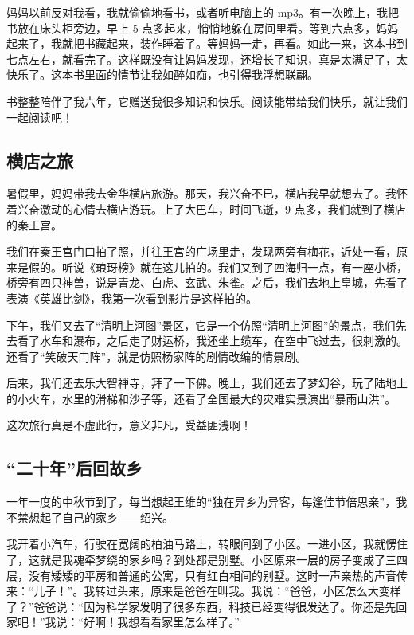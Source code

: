 \documentclass[UTF8,a4paper,titlepage,twoside,10.5pt]{article}
\begin{document}
妈妈以前反对我看，我就偷偷地看书，或者听电脑上的 mp3。有一次晚上，我把书放在床头柜旁边，早上 5 点多起来，悄悄地躲在房间里看。等到六点多，妈妈起来了，我就把书藏起来，装作睡着了。等妈妈一走，再看。如此一来，这本书到七点左右，就看完了。这样既没有让妈妈发现，还增长了知识，真是太满足了，太快乐了。这本书里面的情节让我如醉如痴，也引得我浮想联翩。

书整整陪伴了我六年，它赠送我很多知识和快乐。阅读能带给我们快乐，就让我们一起阅读吧！

\subsection{横店之旅}
\label{sec:orgd0e0a89}

暑假里，妈妈带我去金华横店旅游。那天，我兴奋不已，横店我早就想去了。我怀着兴奋激动的心情去横店游玩。上了大巴车，时间飞逝，9 点多，我们就到了横店的秦王宫。

我们在秦王宫门口拍了照，并往王宫的广场里走，发现两旁有梅花，近处一看，原来是假的。听说《琅玡榜》就在这儿拍的。我们又到了四海归一点，有一座小桥，桥旁有四只神兽，说是青龙、白虎、玄武、朱雀。之后，我们去地上皇城，先看了表演《英雄比剑》，我第一次看到影片是这样拍的。

下午，我们又去了“清明上河图”景区，它是一个仿照“清明上河图”的景点，我们先去看了水车和瀑布，之后走了财运桥，我还坐上缆车，在空中飞过去，很刺激的。还看了“笑破天门阵”，就是仿照杨家阵的剧情改编的情景剧。

后来，我们还去乐大智禅寺，拜了一下佛。晚上，我们还去了梦幻谷，玩了陆地上的小火车，水里的滑梯和沙子等，还看了全国最大的灾难实景演出“暴雨山洪”。

这次旅行真是不虚此行，意义非凡，受益匪浅啊！

\subsection{“二十年”后回故乡}
\label{sec:org748952e}

一年一度的中秋节到了，每当想起王维的“独在异乡为异客，每逢佳节倍思亲”，我不禁想起了自己的家乡——绍兴。

我开着小汽车，行驶在宽阔的柏油马路上，转眼间到了小区。一进小区，我就愣住了，这就是我魂牵梦绕的家乡吗？到处都是别墅。小区原来一层的房子变成了三四层，没有矮矮的平房和普通的公寓，只有红白相间的别墅。这时一声亲热的声音传来：“儿子！”。我转过头来，原来是爸爸在叫我。我说：“爸爸，小区怎么大变样了？”爸爸说：“因为科学家发明了很多东西，科技已经变得很发达了。你还是先回家吧！”我说：“好啊！我想看看家里怎么样了。”
\end{document}
